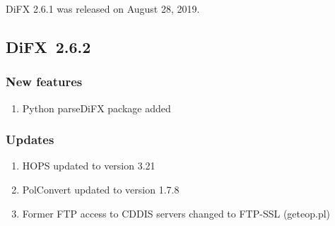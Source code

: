 DiFX 2.6.1 was released on August 28, 2019.


\subsection{DiFX~2.6.2}

\subsubsection{New features}
\begin{enumerate}
\item Python parseDiFX package added
\end{enumerate}

\subsubsection{Updates}
\begin{enumerate}
\item HOPS updated to version 3.21
\item PolConvert updated to version 1.7.8
\item Former FTP access to CDDIS servers changed to FTP-SSL (geteop.pl)
\end{enumerate}

